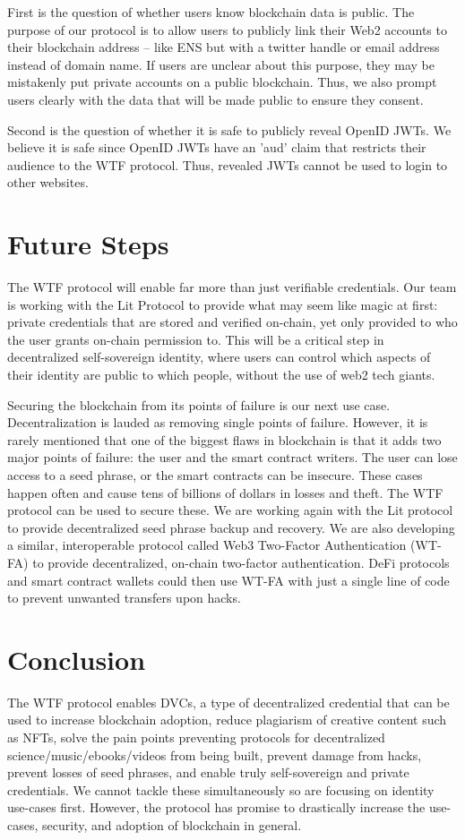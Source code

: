 \documentclass[11pt,oneside,a4paper]{article}
\begin{document}
		First is the question of whether users know blockchain data is public. The purpose of our protocol is to allow users to publicly link their Web2 accounts to their blockchain address -- like ENS but with a twitter handle or email address instead of domain name. If users are unclear about this purpose, they may be mistakenly put private accounts on a public blockchain. Thus, we also prompt users clearly with the data that will be made public to ensure they consent. 
		
		Second is the question of whether it is safe to publicly reveal OpenID JWTs. We believe it is safe since OpenID JWTs have an 'aud' claim that restricts their audience to the WTF protocol. Thus, revealed JWTs cannot be used to login to other websites.
		
	\section{Future Steps}
	The WTF protocol will enable far more than just verifiable credentials. Our team is working with the Lit Protocol to provide what may seem like magic at first: private credentials that are stored and verified on-chain, yet only provided to who the user grants on-chain permission to. This will be a critical step in decentralized self-sovereign identity, where users can control which aspects of their identity are public to which people, without the use of web2 tech giants. 
	
		Securing the blockchain from its points of failure is our next use case. Decentralization is lauded as removing single points of failure. However, it is rarely mentioned that one of the biggest flaws in blockchain is that it adds two major points of failure: the user and the smart contract writers. The user can lose access to a seed phrase, or the smart contracts can be insecure. These cases happen often and cause tens of billions of dollars in losses and theft. The WTF protocol can be used to secure these. We are working again with the Lit protocol to provide decentralized seed phrase backup and recovery. We are also developing a similar, interoperable protocol called Web3 Two-Factor Authentication (WT-FA) to provide decentralized, on-chain two-factor authentication. DeFi protocols and smart contract wallets could then use WT-FA with just a single line of code to prevent unwanted transfers upon hacks. 
		
		\section{Conclusion}
			The WTF protocol enables DVCs, a type of decentralized credential that can be used to increase blockchain adoption, reduce plagiarism of creative content such as NFTs, solve the pain points preventing protocols for decentralized science/music/ebooks/videos from being built, prevent damage from hacks, prevent losses of seed phrases, and enable truly self-sovereign and private credentials. We cannot tackle these simultaneously so are focusing on identity use-cases first. However, the protocol has promise to drastically increase the use-cases, security, and adoption of blockchain in general.
\end{document}
